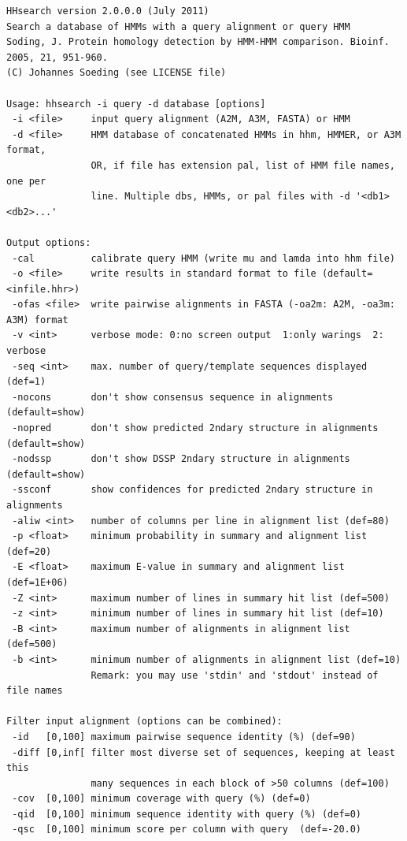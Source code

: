 \documentclass[11pt,a4paper]{article}
\begin{document}
\small \begin{verbatim}
HHsearch version 2.0.0.0 (July 2011)
Search a database of HMMs with a query alignment or query HMM
Soding, J. Protein homology detection by HMM-HMM comparison. Bioinf. 2005, 21, 951-960.
(C) Johannes Soeding (see LICENSE file)

Usage: hhsearch -i query -d database [options]                       
 -i <file>     input query alignment (A2M, A3M, FASTA) or HMM
 -d <file>     HMM database of concatenated HMMs in hhm, HMMER, or A3M format,
               OR, if file has extension pal, list of HMM file names, one per
               line. Multiple dbs, HMMs, or pal files with -d '<db1> <db2>...'

Output options:                                                              
 -cal          calibrate query HMM (write mu and lamda into hhm file)        
 -o <file>     write results in standard format to file (default=<infile.hhr>)
 -ofas <file>  write pairwise alignments in FASTA (-oa2m: A2M, -oa3m: A3M) format
 -v <int>      verbose mode: 0:no screen output  1:only warings  2: verbose   
 -seq <int>    max. number of query/template sequences displayed (def=1) 
 -nocons       don't show consensus sequence in alignments (default=show)     
 -nopred       don't show predicted 2ndary structure in alignments (default=show)
 -nodssp       don't show DSSP 2ndary structure in alignments (default=show)  
 -ssconf       show confidences for predicted 2ndary structure in alignments
 -aliw <int>   number of columns per line in alignment list (def=80)
 -p <float>    minimum probability in summary and alignment list (def=20)   
 -E <float>    maximum E-value in summary and alignment list (def=1E+06)       
 -Z <int>      maximum number of lines in summary hit list (def=500)         
 -z <int>      minimum number of lines in summary hit list (def=10)         
 -B <int>      maximum number of alignments in alignment list (def=500)      
 -b <int>      minimum number of alignments in alignment list (def=10)      
               Remark: you may use 'stdin' and 'stdout' instead of file names

Filter input alignment (options can be combined):                             
 -id   [0,100] maximum pairwise sequence identity (%) (def=90)   
 -diff [0,inf[ filter most diverse set of sequences, keeping at least this    
               many sequences in each block of >50 columns (def=100)
 -cov  [0,100] minimum coverage with query (%) (def=0) 
 -qid  [0,100] minimum sequence identity with query (%) (def=0) 
 -qsc  [0,100] minimum score per column with query  (def=-20.0)


\end{verbatim}
\end{document}
